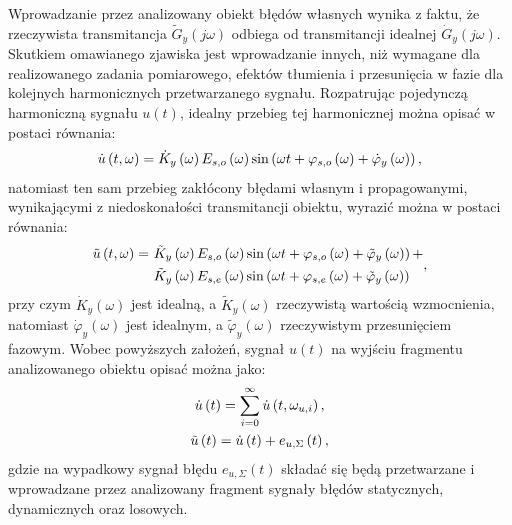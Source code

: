 Wprowadzanie przez analizowany obiekt błędów własnych wynika z faktu, że rzeczywista transmitancja $\tilde{G}_{y}(j\omega)$ odbiega od transmitancji idealnej $\dot{G}_{y}(j\omega)$. Skutkiem omawianego zjawiska jest wprowadzanie innych, niż wymagane dla realizowanego zadania pomiarowego, efektów tłumienia i przesunięcia w fazie dla kolejnych harmonicznych przetwarzanego sygnału. Rozpatrując pojedynczą harmoniczną sygnału $u(t)$, idealny przebieg tej harmonicznej można opisać w postaci równania:
\begin{equation}
\dot{u} \left(t,\omega\right) = \dot{K}_{y} \left(\omega\right) E_{s,o} \left(\omega\right) \sin \left( \omega t + \varphi_{s,o} \left(\omega\right) + \dot{\varphi}_{y} \left(\omega\right) \right) \label{eq:mid_cont_omega_ideal},
\end{equation}
natomiast ten sam przebieg zakłócony błędami własnym i propagowanymi, wynikającymi z niedoskonałości transmitancji obiektu, wyrazić można w postaci równania:
\begin{equation}
\begin{split}
\tilde{u} \left(t,\omega\right) =~
& \tilde{K}_{y} \left(\omega\right) E_{s,o} \left(\omega\right) \sin \left( \omega t + \varphi_{s,o} \left(\omega\right) + \tilde{\varphi}_{y} \left(\omega\right) \right) + \\
& \tilde{K}_{y} \left(\omega\right) E_{s,e} \left(\omega\right) \sin \left( \omega t + \varphi_{s,e} \left(\omega\right) + \tilde{\varphi}_{y} \left(\omega\right) \right)
\end{split}
\label{eq:mid_cont_omega_real},
\end{equation}
przy czym $\dot{K}_{y}(\omega)$ jest idealną, a $\tilde{K}_{y}(\omega)$ rzeczywistą wartością wzmocnienia, natomiast $\dot{\varphi}_{y}(\omega)$ jest idealnym, a $\tilde{\varphi}_{y}(\omega)$ rzeczywistym przesunięciem fazowym. Wobec powyższych założeń, sygnał $u(t)$ na wyjściu fragmentu analizowanego obiektu opisać można jako:
\begin{gather}
\dot{u} \left(t\right) = \sum _{i = 0} ^{\infty} \dot{u} \left( t, \omega_{u,i} \right) \label{eq:mid_cont_sum_ideal}, \\
\tilde{u} \left(t\right) = \dot{u} \left(t\right) + e_{u,\Sigma} \left(t\right) \label{eq:mid_cont_sum_real},
\end{gather}
gdzie na wypadkowy sygnał błędu $e_{u,\Sigma}(t)$ składać się będą przetwarzane i wprowadzane przez analizowany fragment sygnały błędów statycznych, dynamicznych oraz losowych.

